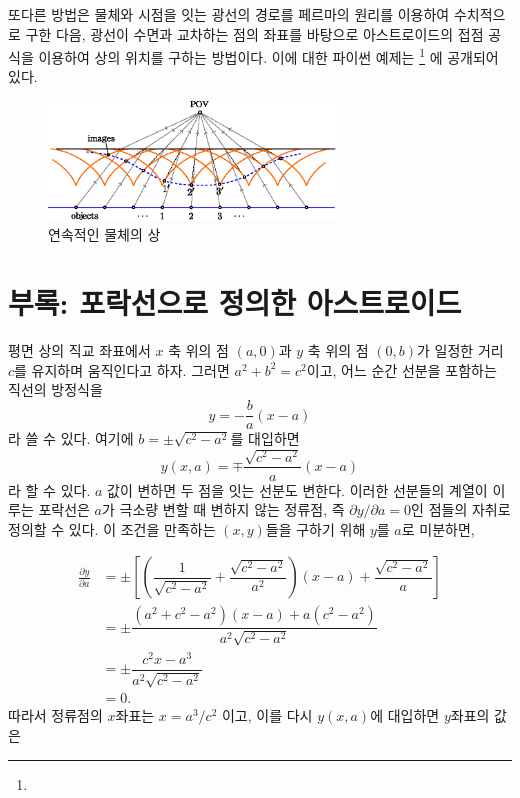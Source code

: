 \documentclass[twocolumn]{article}
\begin{document}
또다른 방법은 물체와 시점을 잇는 광선의 경로를 페르마의 원리를 이용하여 수치적으로 
구한 다음, 광선이 수면과 교차하는 점의 좌표를 바탕으로 아스트로이드의 접점 공식을 이용하여
상의 위치를 구하는 방법이다. 이에 대한 파이썬 예제는  
\href{https://github.com/mingshey/python_projects/blob/main/Refraction_Image.ipynb}%
{}\footnote{} 에 공개되어 있다.

\begin{figure}[ht]
	\centering
	\includegraphics*[width=3in]{figs/g240.eps}
	\caption{연속적인 물체의 상}
	\label{fig:extended_image}
\end{figure}

\appendix
\newcommand{\pd}[2]{{\frac{\partial #1}{\partial #2}}}
\newcommand{\ilpd}[2]{{{\partial #1}/{\partial #2}}}
\section*{부록: 포락선으로 정의한 아스트로이드}
평면 상의 직교 좌표에서 $x$ 축 위의 점  $(a, 0)$과 $y$ 축 위의 점 $(0, b)$가 일정한 거리 $c$를 유지하며 움직인다고 하자. 그러면 $a^2+b^2=c^2$이고, 어느 순간 선분을 포함하는 직선의 방정식을 
$$y=-\dfrac{b}{a}(x-a)$$
라 쓸 수 있다. 여기에 
$b=\pm \sqrt{c^2-a^2}$를 대입하면 
$$y(x, a) = \mp \dfrac{\sqrt{c^2-a^2}}{a}(x-a)$$
라 할 수 있다. 
$a$ 값이 변하면 두 점을 잇는 선분도 변한다. 이러한 선분들의 계열이 이루는 포락선은 $a$가 극소량 변할 때 변하지 않는 정류점, 즉
$\ilpd{y}{a} = 0$인 점들의 자취로 정의할 수 있다. 이 조건을 만족하는 $(x, y)$들을 구하기 위해 $y$를 $a$로 미분하면,

$$ \begin{aligned}
\pd{y}{a} &= \pm\left[\left( \dfrac{1}{\sqrt{c^2-a^2}}+\dfrac{\sqrt{c^2-a^2}}{a^2}\right) (x-a) + \dfrac{\sqrt{c^2-a^2}}{a} \right]\\
	&= \pm \dfrac{(a^2+c^2-a^2)(x-a)+a(c^2-a^2)}{a^2\sqrt{c^2-a^2}}\\
	&= \pm \dfrac{c^2 x - a^3}{a^2 \sqrt{c^2 - a^2}}\\
	&= 0.
\end{aligned}
$$
따라서 정류점의 $x$좌표는 $x = a^3/c^2$ 이고, 이를 다시 $y(x, a)$에 대입하면 $y$좌표의 값은
\end{document}
